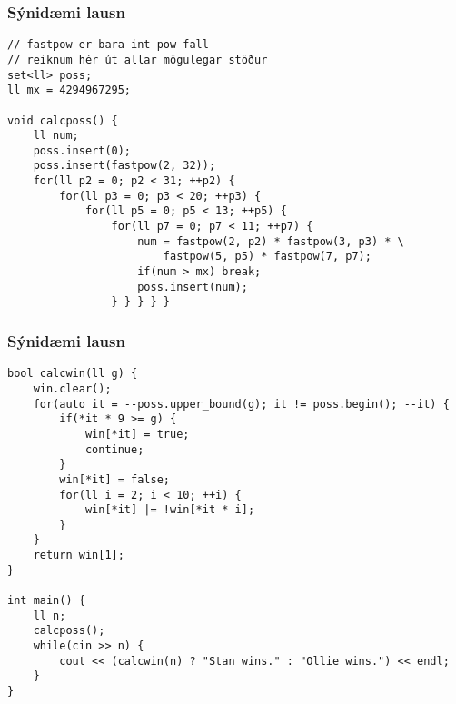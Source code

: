 \documentclass{beamer}
\begin{document}
\begin{frame}[fragile]
\frametitle{Sýnidæmi lausn}

\begin{small}
\begin{verbatim}
// fastpow er bara int pow fall
// reiknum hér út allar mögulegar stöður
set<ll> poss;
ll mx = 4294967295;

void calcposs() {
    ll num;
    poss.insert(0);
    poss.insert(fastpow(2, 32));
    for(ll p2 = 0; p2 < 31; ++p2) {
        for(ll p3 = 0; p3 < 20; ++p3) {
            for(ll p5 = 0; p5 < 13; ++p5) {
                for(ll p7 = 0; p7 < 11; ++p7) {
                    num = fastpow(2, p2) * fastpow(3, p3) * \
                        fastpow(5, p5) * fastpow(7, p7);
                    if(num > mx) break;
                    poss.insert(num);
                } } } } } 
\end{verbatim}
\end{small}

\end{frame}

\begin{frame}[fragile]
\frametitle{Sýnidæmi lausn}

\begin{scriptsize}
\begin{verbatim}
bool calcwin(ll g) {
    win.clear();
    for(auto it = --poss.upper_bound(g); it != poss.begin(); --it) {
        if(*it * 9 >= g) {
            win[*it] = true;
            continue;
        }
        win[*it] = false;
        for(ll i = 2; i < 10; ++i) {
            win[*it] |= !win[*it * i];
        }
    }
    return win[1];
}

int main() {
    ll n;
    calcposs();
    while(cin >> n) {
        cout << (calcwin(n) ? "Stan wins." : "Ollie wins.") << endl;
    }
}
\end{verbatim}
\end{scriptsize}

\end{frame}
\end{document}
